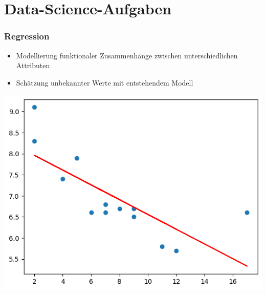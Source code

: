 
\section{Data-Science-Aufgaben}

\begin{frame}
\frametitle{Regression}

\begin{itemize}
\item Modellierung funktionaler Zusammenhänge zwischen unterschiedlichen Attributen
\item Schätzung unbekannter Werte mit entstehendem Modell
\end{itemize}

\begin{center}
\includegraphics[scale=0.4]{fig1/linear_regression.png}
\end{center}

\end{frame}



